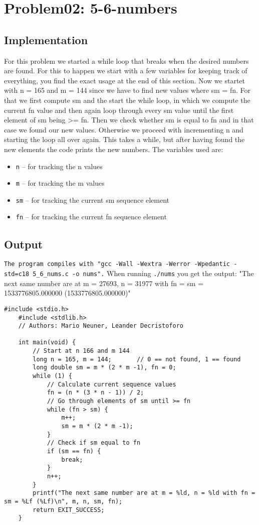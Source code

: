 \documentclass[12pt,a4paper]{article}
\begin{document}
\vspace{10em}

\section{Problem02: 5-6-numbers}
\subsection{Implementation}
For this problem we started a while loop that breaks when the desired numbers are found.
For this to happen we start with a few variables for keeping track of everything, you find 
the exact usage at the end of this section. Now we startet with n = 165 and m = 144 since we
have to find new values where sm = fn. For that we first compute sm and the start the while 
loop, in which we compute the current fn value and then again loop through every sm value until
the first element of sm being >= fn. Then we check whether sm is equal to fn and in that case we
found our new values. Otherwise we proceed with incrementing n and starting the loop all over
again. This takes a while, but after having found the new elements the code prints the new numbers.
The variables used are: 
\begin{itemize}
    \item \texttt{n} -- for tracking the n values
    \item \texttt{m} -- for tracking the m values
    \item \texttt{sm} -- for tracking the current sm sequence element
    \item \texttt{fn} -- for tracking the current fn sequence element
\end{itemize}
\subsection{Output}
\texttt{The program compiles with "gcc -Wall -Wextra -Werror -Wpedantic -std=c18 5\_6\_nums.c -o nums".}
When running \texttt{./nums} you get the output: 
\newline
"The next same number are at m = 27693, n = 31977 with fn = sm = 1533776805.000000 (1533776805.000000)"

\begin{lstlisting}[caption={7001st prime in C},label={lst:p7001}]
    #include <stdio.h>
    #include <stdlib.h>
    // Authors: Mario Neuner, Leander Decristoforo

    int main(void) {
        // Start at n 166 and m 144
        long n = 165, m = 144;       // 0 == not found, 1 == found
        long double sm = m * (2 * m -1), fn = 0;
        while (1) {
            // Calculate current sequence values
            fn = (n * (3 * n - 1)) / 2;
            // Go through elements of sm until >= fn
            while (fn > sm) {
                m++;
                sm = m * (2 * m -1);
            }
            // Check if sm equal to fn
            if (sm == fn) {
                break;
            }
            n++;
        }
        printf("The next same number are at m = %ld, n = %ld with fn = sm = %Lf (%Lf)\n", m, n, sm, fn);
        return EXIT_SUCCESS; 
    }
\end{lstlisting}
\end{document}
